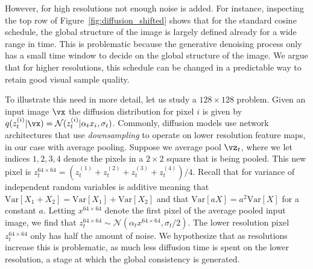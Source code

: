 However, for high resolutions not enough noise is added. For instance, inspecting the top row of Figure~\ref{fig:diffusion_shifted} shows that for the standard cosine schedule, the global structure of the image is largely defined already for a wide range in time. This is problematic because the generative denoising process only has a small time window to decide on the global structure of the image. We argue that for higher resolutions, this schedule can be changed in a predictable way to retain good visual sample quality.

To illustrate this need in more detail, let us study a $128 \times 128$ problem. Given an input image $\vx$ the diffusion distribution for pixel $i$ is given by $q(z_t^{(i)} | \vx) = \mathcal{N}(z_t^{(i)} | \alpha_t x_i, \sigma_t)$. Commonly, diffusion models use network architectures that use \textit{downsampling} to operate on lower resolution feature maps, in our case with average pooling. Suppose we average pool $\vz_t$, where we let indices $1, 2, 3, 4$ denote the pixels in a $2 \times 2$ square that is being pooled. This new pixel is $z^{64 \times 64}_t = (z_t^{(1)} + z_t^{(2)} + z_t^{(3)} + z_t^{(4)}) / 4$. Recall that for variance of independent random variables is additive meaning that $\mathrm{Var}[X_1 + X_2] = \mathrm{Var}[X_1] + \mathrm{Var}[X_2]$ and that $\mathrm{Var}[aX] = a^2\mathrm{Var}[X]$ for a constant $a$. Letting $x^{64 \times 64}$ denote the first pixel of the average pooled input image, we find that $z^{64 \times 64}_t \sim \mathcal{N}(\alpha_t x^{64 \times 64}, \sigma_t / 2)$. The lower resolution pixel $z^{64 \times 64}_t$ only has half the amount of noise. We hypothesize that as resolutions increase this is problematic, as much less diffusion time is spent on the lower resolution, a stage at which the global consistency is generated.

